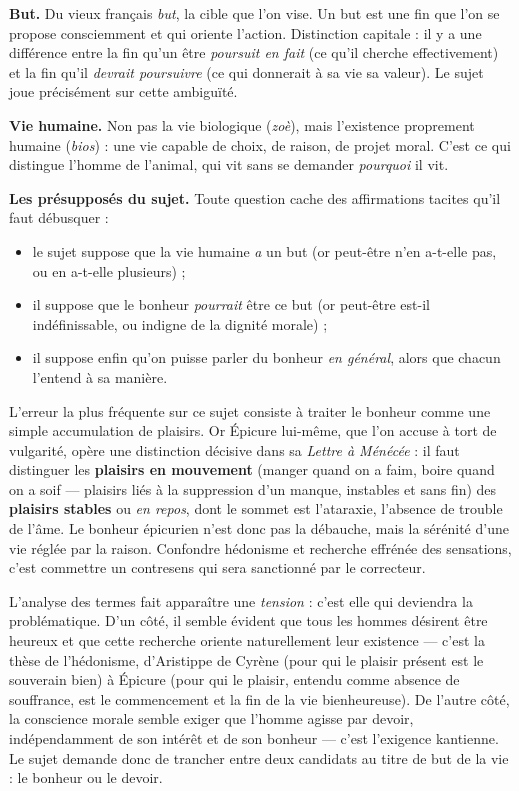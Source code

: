 \documentclass[11pt]{article}
\newcommand{\cle}[1]{{\popxbold\color{popdark}#1}}
\newcounter{popsec}
\newcounter{popsub}
\newcommand{\courssub}[1]{%
  \stepcounter{popsub}%
  \par\vspace{9pt}\noindent{\popxbold\fontsize{11.5}{13}\selectfont\color{popink}{\color{poporange}\thepopsec.\thepopsub}\hspace{6pt}#1}\par\nopagebreak\vspace{4pt}
}
\begin{document}
\textbf{\cle{But}.} Du vieux français \emph{but}, la cible que l'on vise. Un but est une fin que l'on se propose consciemment et qui oriente l'action. Distinction capitale : il y a une différence entre la fin qu'un être \emph{poursuit en fait} (ce qu'il cherche effectivement) et la fin qu'il \emph{devrait poursuivre} (ce qui donnerait à sa vie sa valeur). Le sujet joue précisément sur cette ambiguïté.

\textbf{\cle{Vie humaine}.} Non pas la vie biologique (\emph{zoè}), mais l'existence proprement humaine (\emph{bios}) : une vie capable de choix, de raison, de projet moral. C'est ce qui distingue l'homme de l'animal, qui vit sans se demander \emph{pourquoi} il vit.

\textbf{Les présupposés du sujet.} Toute question cache des affirmations tacites qu'il faut débusquer :
\begin{itemize}
\item le sujet suppose que la vie humaine \emph{a} un but (or peut-être n'en a-t-elle pas, ou en a-t-elle plusieurs) ;
\item il suppose que le bonheur \emph{pourrait} être ce but (or peut-être est-il indéfinissable, ou indigne de la dignité morale) ;
\item il suppose enfin qu'on puisse parler du bonheur \emph{en général}, alors que chacun l'entend à sa manière.
\end{itemize}

\begin{attention}
L'erreur la plus fréquente sur ce sujet consiste à traiter le bonheur comme une simple accumulation de plaisirs. Or Épicure lui-même, que l'on accuse à tort de vulgarité, opère une distinction décisive dans sa \emph{Lettre à Ménécée} : il faut distinguer les \textbf{plaisirs en mouvement} (manger quand on a faim, boire quand on a soif — plaisirs liés à la suppression d'un manque, instables et sans fin) des \textbf{plaisirs stables} ou \emph{en repos}, dont le sommet est l'\cle{ataraxie}, l'absence de trouble de l'âme. Le bonheur épicurien n'est donc pas la débauche, mais la sérénité d'une vie réglée par la raison. Confondre hédonisme et recherche effrénée des sensations, c'est commettre un contresens qui sera sanctionné par le correcteur.
\end{attention}

\courssub{Étape 2 : la formulation de la problématique}

L'analyse des termes fait apparaître une \emph{tension} : c'est elle qui deviendra la problématique. D'un côté, il semble évident que tous les hommes désirent être heureux et que cette recherche oriente naturellement leur existence — c'est la thèse de l'\cle{hédonisme}, d'Aristippe de Cyrène (pour qui le plaisir présent est le souverain bien) à Épicure (pour qui le plaisir, entendu comme absence de souffrance, est le commencement et la fin de la vie bienheureuse). De l'autre côté, la conscience morale semble exiger que l'homme agisse par devoir, indépendamment de son intérêt et de son bonheur — c'est l'exigence kantienne. Le sujet demande donc de trancher entre deux candidats au titre de \guillemotleft but de la vie \guillemotright : le bonheur ou le devoir.
\end{document}
